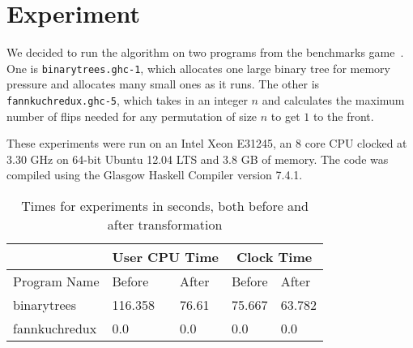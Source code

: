 \documentclass{sigplanconf}
\begin{document}
\section{Experiment}\label{sec:expr}
We decided to run the algorithm on two programs from the benchmarks game~\cite{bgames}. One is \lstinline!binarytrees.ghc-1!, which allocates one large binary tree for memory pressure and allocates many small ones as it runs. The other is \lstinline!fannkuchredux.ghc-5!, which takes in an integer $n$ and calculates the maximum number of flips needed for any permutation of size $n$ to get $1$ to the front.

These experiments were run on an Intel Xeon E31245, an 8 core CPU clocked at 3.30 GHz on 64-bit Ubuntu 12.04 LTS and 3.8 GB of memory. The code was compiled using the Glasgow Haskell Compiler version 7.4.1.
\begin{table}[t]
\label{tab:expr}
\begin{tabular}{| l | l | l | l | l |}
\hline
 & \multicolumn{2}{|c|}{User CPU Time} & \multicolumn{2}{|c|}{Clock Time}\\
\hline
Program Name & Before & After & Before & After\\
\hline
binarytrees & 116.358 & 76.61 & 75.667 & 63.782\\
\hline
fannkuchredux & 0.0 & 0.0 & 0.0 & 0.0\\
\hline
\end{tabular}
\caption{Times for experiments in seconds, both before and after transformation}
\end{table}
\end{document}
